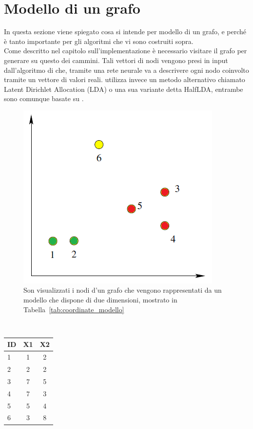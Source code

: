 \section{Modello di un grafo}
In questa sezione viene spiegato cosa si intende per modello di un grafo, e perché è tanto importante per gli algoritmi che vi sono costruiti sopra.\\
Come descritto nel capitolo sull'implementazione è necessario visitare il grafo per generare su questo dei cammini. Tali vettori di nodi vengono presi in input dall'algoritmo di \wv che, tramite una rete neurale va a descrivere ogni nodo coinvolto tramite un vettore di valori reali. \cnrl utilizza invece un metodo alternativo chiamato Latent Dirichlet Allocation (LDA)\cite{LDA} o una sua variante detta HalfLDA, entrambe sono comunque basate su \wv.\\
\begin{figure}[htp]
	\centering
	\includegraphics{immagini/punti_modello}
	\caption{Son visualizzati i nodi d'un grafo che vengono rappresentati da un modello che dispone di due dimensioni, mostrato in Tabella~\ref{tab:coordinate_modello}}
	\label{fig:grafico_modello}
\end{figure}
\\
\begin{center}
	\begin{tabular}{|l|cc|}
		\hline
		ID&X1&X2\\
		\hline
		1 & 1 & 2\\
		2 & 2 & 2\\
		3 & 7 & 5\\
		4 & 7 & 3\\
		5 & 5 & 4\\
		6 & 3 & 8\\
		\hline
	\end{tabular}
	\label{tab:coordinate_modello}
\end{center}
